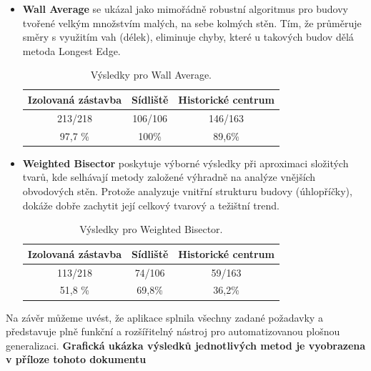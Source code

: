 \begin{itemize}
    \item \textbf{Wall Average} se ukázal jako mimořádně robustní algoritmus pro  budovy tvořené velkým množstvím malých, na sebe kolmých stěn. Tím, že průměruje směry s využitím vah (délek), eliminuje chyby, které u takových budov dělá metoda Longest Edge.
        \begin{table}[h!]
\centering
\begin{tabular}{|c|c|c|}
\hline
 Izolovaná zástavba & Sídliště & Historické centrum  \\
 \hline
213/218 & 106/106  &  146/163 \\
\hline
 97,7 \% & 100\%  & 89,6\%  \\
 \hline
\end{tabular}
    \caption{Výsledky pro Wall Average.}
\label{table:MBR}
\end{table}
    \item \textbf{Weighted Bisector} poskytuje výborné výsledky při aproximaci složitých tvarů, kde selhávají metody založené výhradně na analýze vnějších obvodových stěn. Protože analyzuje vnitřní strukturu budovy (úhlopříčky), dokáže dobře zachytit její celkový tvarový a težištní trend.
        \begin{table}[h!]
\centering
\begin{tabular}{|c|c|c|}
\hline
 Izolovaná zástavba & Sídliště & Historické centrum  \\
 \hline
113/218 & 74/106  &  59/163 \\
\hline
 51,8 \% & 69,8\%  & 36,2\%  \\
 \hline
\end{tabular}
    \caption{Výsledky pro Weighted Bisector.}
\label{table:MBR}
\end{table}
\end{itemize}

Na závěr můžeme uvést, že aplikace splnila všechny zadané požadavky a představuje plně funkční a rozšířitelný nástroj pro automatizovanou plošnou generalizaci. \textbf {Grafická ukázka výsledků jednotlivých metod je vyobrazena v příloze tohoto dokumentu}











